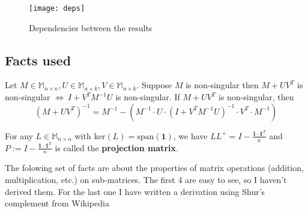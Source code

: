 \begin{figure}[h!]

\begin{center}
\texttt{[image: deps]} 
\end{center}
\caption{Dependencies between the results}
 
\end{figure}

\subsection{Facts used}

\begin{HXf}
 Let $ M \in \mathbb{M}_{n \times n} , U \in \mathbb{M}_{n \times k}, V \in \mathbb{M}_{n \times k}$. Suppose $M$ is non-singular then $M + UV^T$ is non-singular $\iff \ I + V^T M^{-1} U$ is non-singular. If $M + UV^T$ is non-singular, then 
 $$ (M + UV^T)^{-1} = M^{-1} - \left( M^{-1} \cdot U \cdot (I + V^TM^{-1}U)^{-1} \cdot V^T \cdot M^{-1}\right) $$
\end{HXf}


\begin{HXf}
 For any $L \in \mathbb{M}_{n \times n}$ with $\text{ker}(L) = \text{span}(\textbf{1})$, we have $LL^+ = I - \frac{\textbf{1} \cdot \textbf{1}^T}{n}$ and $P := I - \frac{\textbf{1} \cdot \textbf{1}^T}{n}$ is called the \textbf{projection matrix}. 
\end{HXf}

The folowing set of facts are about the properties of matrix operations (addition, multiplication, etc.) on sub-matrices. The first 4 are easy to see, so I haven't derived them. For the last one I have written a derivation using Shur's complement from Wikipedia

